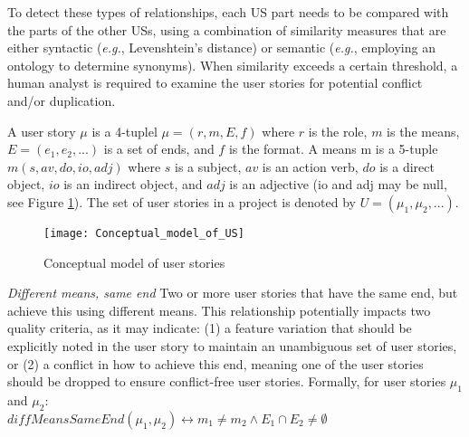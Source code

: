 To detect these types of relationships, each US part needs to be compared with the parts of the other USs, using a combination of similarity measures that are either syntactic (\emph{e.g.}, Levenshtein’s distance) or semantic (\emph{e.g.}, employing an ontology to determine synonyms). When similarity exceeds a certain threshold, a human analyst is required to examine the user stories for potential conflict and/or duplication.
\begin{definition}
A user story $\mu$ is a 4-tuplel $\mu=(r,m,E,f)$ where $r$ is the role, $m$ is the means, $E=(e_1, e_2, . . .)$ is a set of ends, and $f$ is the format. A means m is a 5-tuple $m (s,av,do,io,adj)$ where $s$ is a subject, $av$ is an action verb, $do$ is a direct object, $io$ is an indirect object, and $adj$ is an adjective (io and adj may be null, see Figure \ref{fig:conceptual_model}). The set of user stories in a project is denoted by $U=(\mu_1, \mu_2, . . .)$.
\end{definition}
\begin{figure}
\center
\texttt{[image: Conceptual\_model\_of\_US]}
\caption{Conceptual model of user stories \cite{lucassen2016improving}}\label{fig:conceptual_model}
\end{figure}
\begin{definition}
\emph{Different means, same end }Two or more user stories that have the same end, but achieve this using different means. This relationship potentially impacts two quality criteria, as it may indicate: (1) a feature variation that should be explicitly noted in the user story to maintain an unambiguous set of user stories, or (2) a conflict in how to achieve this end, meaning one of the user stories should be dropped to ensure conflict-free user stories. Formally, for user stories $\mu_1$ and $\mu_2$:\\ 
$diffMeansSameEnd(\mu_1,\mu_2)\leftrightarrow m_1 \neq m_2 \wedge E_1 \cap E_2 \neq \emptyset$
\end{definition}
